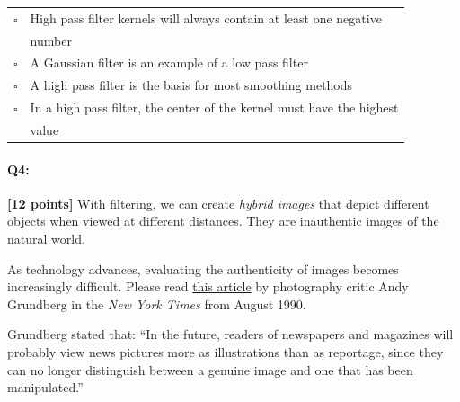 \documentclass[11pt]{article}
\begin{document}
\begin{enumerate}[(a)]
\begin{tcolorbox}[colback=white!5!white,colframe=green!75!black]
\begin{tabular}[h]{ll}
$\square$ & High pass filter kernels will always contain at least one negative \\
& number \\
$\square$ & A Gaussian filter is an example of a low pass filter \\
$\square$ & A high pass filter is the basis for most smoothing methods \\
$\square$ & In a high pass filter, the center of the kernel must have the highest \\ 
& value \\
\end{tabular}
\end{tcolorbox}

\end{enumerate}


\pagebreak
\paragraph{Q4:} \textbf{[12 points]} With filtering, we can create \emph{hybrid images} that depict different objects when viewed at different distances. They are inauthentic images of the natural world.

As technology advances, evaluating the authenticity of images becomes increasingly difficult. Please read \href{https://www.nytimes.com/1990/08/12/arts/photography-view-ask-it-no-questions-the-camera-can-lie.html}{this article} by photography critic Andy Grundberg in the \emph{New York Times} from August 1990.

Grundberg stated that: ``In the future, readers of newspapers and magazines will probably view news pictures more as illustrations than as reportage, since they can no longer distinguish between a genuine image and one that has been manipulated.''
\end{document}
